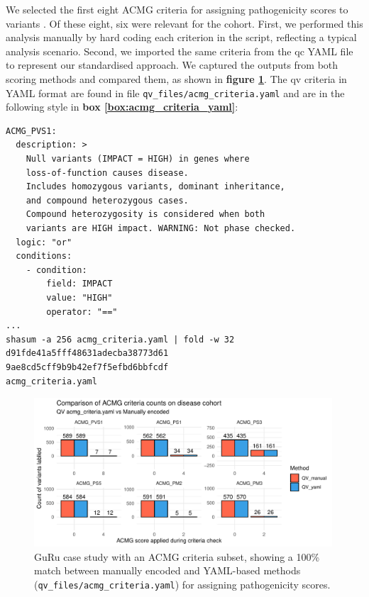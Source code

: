 We selected the first eight ACMG criteria for assigning pathogenicity scores to variants \cite{richards2015standards}. Of these eight, six were relevant for the cohort.
First, we performed this analysis manually by hard coding each criterion in the script, reflecting a typical analysis scenario. Second, we imported the same criteria from the \ac{qc} YAML file to represent our standardised approach. We captured the outputs from both scoring methods and compared them, as shown in \textbf{figure \ref{fig:guru_case_study_result}}.
The \ac{qv} criteria in YAML format are found in file \texttt{qv\_files/acmg\_criteria.yaml} and are in the following style in 
\textbf{box \ref{box:acmg_criteria_yaml}}:

\begin{tcolorbox}[
    colback=white!0,  %
    colframe=black,  %
    boxrule=1pt,  %
    arc=1mm,  %
    outer arc=1mm,
   title=\textbf{\refstepcounter{myboxcounter}\label{box:acmg_criteria_yaml}Box \themyboxcounter: qv\_files/acmg\_criteria.yaml}
]

\begin{verbatim}
ACMG_PVS1:
  description: >
    Null variants (IMPACT = HIGH) in genes where 
    loss-of-function causes disease.
    Includes homozygous variants, dominant inheritance, 
    and compound heterozygous cases.
    Compound heterozygosity is considered when both 
    variants are HIGH impact. WARNING: Not phase checked.
  logic: "or"
  conditions:
    - condition:
        field: IMPACT
        value: "HIGH"
        operator: "=="
...
shasum -a 256 acmg_criteria.yaml | fold -w 32
d91fde41a5fff48631adecba38773d61
9ae8cd5cff9b9b42ef7f5efbd6bbfcdf
acmg_criteria.yaml
\end{verbatim}
\end{tcolorbox}


\begin{figure}[!h]
\centering
\includegraphics[width=0.99\textwidth]{./images/Guru_singlecase_validation_of_yaml_vs_manual.pdf}
\caption{GuRu case study with an ACMG criteria subset, showing a 100\% match between manually encoded and YAML-based methods (\texttt{qv\_files/acmg\_criteria.yaml}) for assigning pathogenicity scores.}
\label{fig:guru_case_study_result}
\end{figure}

